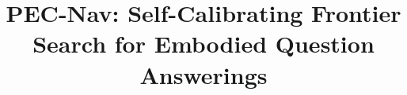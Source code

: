 \documentclass[10pt,twocolumn,letterpaper]{article}
\begin{document}
\title{PEC-Nav: Self-Calibrating Frontier Search for Embodied Question Answerings}

\maketitle
\thispagestyle{empty}















{\small


}
\end{document}
